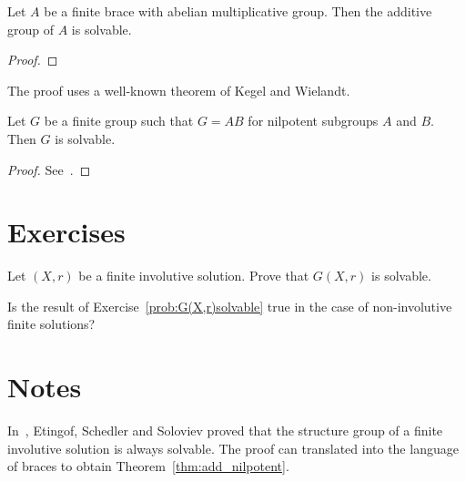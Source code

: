 


\begin{theorem}
Let $A$ be a finite brace with abelian multiplicative group. Then 
the additive group of $A$ is solvable.
\end{theorem}

\begin{proof}
    
\end{proof}

 The proof 
uses a well-known theorem of Kegel and Wielandt.

\begin{theorem}
    Let $G$ be a finite group such that $G=AB$ for nilpotent subgroups $A$ and $B$. Then $G$ is solvable. 
\end{theorem}

\begin{proof}
    See~\cite[Theorem 2.4.3]{MR1211633}.
\end{proof}


\section*{Exercises}

\begin{prob}
\label{prob:G(X,r)solvable}
Let $(X,r)$ be a finite involutive solution. Prove that $G(X,r)$ is solvable. 
\end{prob}

\begin{prob}
Is the result of Exercise~\ref{prob:G(X,r)solvable} true in the case of non-involutive finite solutions?
\end{prob}

\section*{Notes}

In~\cite{MR1722951}, Etingof, Schedler and Soloviev proved that the structure group of a finite involutive
solution is always solvable. The proof can translated into the language of braces 
to obtain Theorem~\ref{thm:add_nilpotent}.


